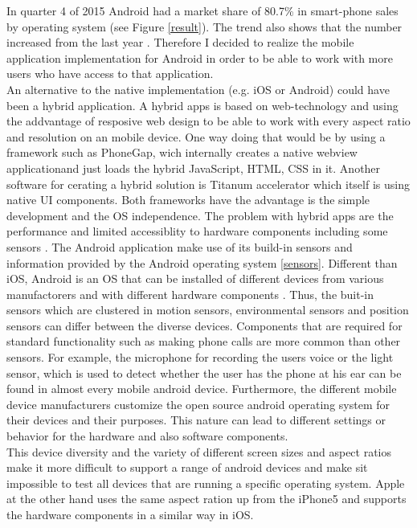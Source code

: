 In quarter 4 of 2015 Android had a market share of 80.7\% in smart-phone sales by operating system (see Figure \ref{result}). The trend also shows that the number increased from the last year \cite{gartnerMobileOSMarketshare}. Therefore I decided to realize the mobile application implementation for Android in order to be able to work with more users who have access to that application.\\
An alternative to the native implementation (e.g. iOS or Android) could have been a hybrid application. A hybrid apps is based on web-technology and using the addvantage of resposive web design to be able to work with every aspect ratio and resolution on an mobile device. One way doing that would be by using a framework such as PhoneGap, wich internally creates a native webview applicationand just loads the hybrid JavaScript, HTML, CSS in it. Another software for cerating a hybrid solution is Titanum accelerator which itself is using native UI components. Both frameworks have the advantage is the simple development and the OS independence. The problem with hybrid apps are the performance and limited accessiblity to hardware components including some sensors \cite{holzinger2012making}.  
\bigbreak
The Android application make use of its build-in sensors and information provided by the Android operating system \ref{sensors}. Different than iOS, Android is an OS that can be installed of different devices from various manufactorers and with different hardware components \cite{goadrich2011smart}. Thus, the buit-in sensors which are clustered in motion sensors, environmental sensors and position sensors \cite{androidDevelopers} can differ between the diverse devices. Components that are required for standard functionality such as making phone calls are more common than other sensors. For example, the microphone for recording the users voice or the light sensor, which is used to detect whether the user has the phone at his ear can be found in almost every mobile android device. 
Furthermore, the different mobile device manufacturers customize the open source android operating system for their devices and their purposes. This nature can lead to different settings or behavior for the hardware and also software components.\\
This device diversity and the variety of different screen sizes and aspect ratios make it more difficult to support a range of android devices and make sit impossible to test all devices that are running a specific operating system. Apple at the other hand uses the same aspect ration up from the iPhone5 and supports the hardware components in a similar way in iOS. 

